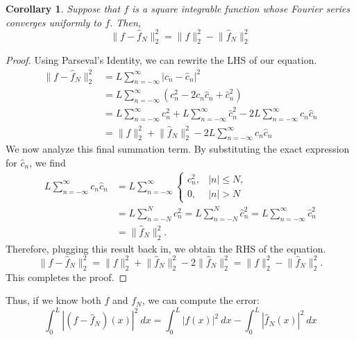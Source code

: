 \documentclass{article}
\newtheorem{corollary}[theorem]{Corollary}
\begin{document}
\begin{corollary}
    Suppose that $f$ is a square integrable function whose Fourier series converges uniformly to $f$. Then,
    \begin{equation*}
        \lVert f - \hat{f}_N \rVert_2^2 = \lVert f \rVert_2^2 - \lVert \hat{f}_N \rVert_2^2
    \end{equation*}
\end{corollary}
\begin{proof}
    Using Parseval's Identity, we can rewrite the LHS of our equation.
    \begin{align}
        \lVert f - \hat{f}_N \rVert_2^2
        &= L \sum_{n=-\infty}^{\infty} |c_n - \hat{c}_n|^2 \\
        &= L \sum_{n=-\infty}^{\infty} (c_n^2 - 2c_n \hat{c}_n + \hat{c}_n^2) \\
        &= L \sum_{n=-\infty}^{\infty} c_n^2 + L \sum_{n=-\infty}^{\infty} \hat{c}_n^2 - 2L \sum_{n=-\infty}^{\infty} c_n \hat{c}_n \\
        &= \lVert f \rVert_2^2 + \lVert \hat{f}_N \rVert_2^2 - 2L \sum_{n=-\infty}^{\infty} c_n \hat{c}_n
    \end{align}
    We now analyze this final summation term. By substituting the exact expression for $\hat{c}_n$, we find
    \begin{align}
        L \sum_{n=-\infty}^{\infty} c_n \hat{c}_n
        &= L \sum_{n=-\infty}^{\infty} \begin{cases}c_n^2,& |n| \leq N,\\ 0,& |n| > N\end{cases} \\
        &= L \sum_{n=-N}^{N} c_n^2 = L \sum_{n=-N}^{N} \hat{c}_n^2 = L \sum_{n=-\infty}^{\infty} \hat{c}_n^2 \\
        &= \lVert \hat{f}_N \rVert_2^2.
    \end{align}
    Therefore, plugging this result back in, we obtain the RHS of the equation.
    \begin{equation}
        \lVert f - \hat{f}_N \rVert_2^2 = \lVert f \rVert_2^2 + \lVert \hat{f}_N \rVert_2^2 - 2 \lVert \hat{f}_N \rVert_2^2 = \lVert f \rVert_2^2 - \lVert \hat{f}_N \rVert_2^2.
    \end{equation}
    This completes the proof.
\end{proof}

Thus, if we know both $f$ and $f_N$, we can compute the error:
\begin{equation*}
    \int_{0}^{L} |(f - \hat{f}_N)(x)|^2\ dx = \int_{0}^{L} |f(x)|^2\ dx - \int_{0}^{L} |\hat{f}_N(x)|^2\ dx
\end{equation*}
\end{document}
